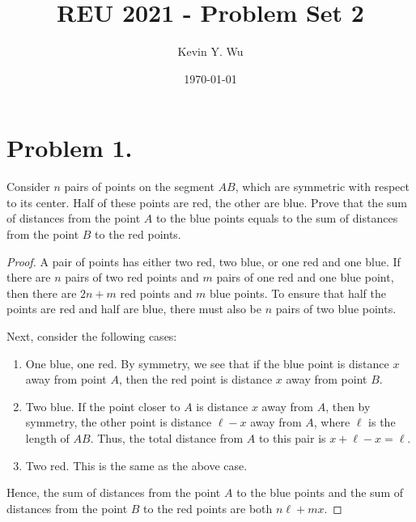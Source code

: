 \documentclass{article}
\title{REU 2021 - Problem Set 2}
\author{Kevin Y. Wu}
\date{\today}
\begin{document}
\maketitle

\tableofcontents
\newpage
{}


\section{Problem 1.}
Consider $n$ pairs of points on the segment $AB$, which are symmetric with respect to its center. Half of these points are red, the other are blue. Prove that the sum of distances from the point $A$ to the blue points equals to the sum of distances from the point $B$ to the red points.
\begin{proof}
A pair of points has either two red, two blue, or one red and one blue. If there are $n$ pairs of two red points and $m$ pairs of one red and one blue point, then there are $2n+m$ red points and $m$ blue points. To ensure that half the points are red and half are blue, there must also be $n$ pairs of two blue points.
\par Next, consider the following cases:
\begin{enumerate}[label=(\arabic*)]
    \item One blue, one red. By symmetry, we see that if the blue point is distance $x$ away from point $A$, then the red point is distance $x$ away from point $B$.
    \item Two blue. If the point closer to $A$ is distance $x$ away from $A$, then by symmetry, the other point is distance $\ell-x$ away from $A$, where $\ell$ is the length of $AB$. Thus, the total distance from $A$ to this pair is $x+\ell-x=\ell$.
    \item Two red. This is the same as the above case.
\end{enumerate}
\par Hence, the sum of distances from the point $A$ to the blue points and the sum of distances from the point $B$ to the red points are both $n\ell+mx$.
\end{proof}
\end{document}
